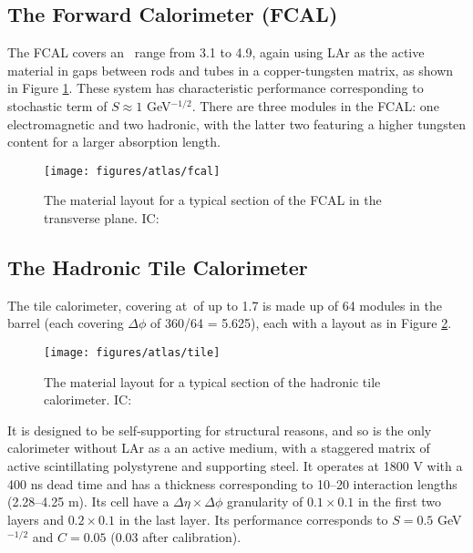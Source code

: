\subsection{The Forward Calorimeter (FCAL)}
The FCAL covers an \aeta\, range from 3.1 to 4.9, again using LAr as the active material in gaps between rods and tubes in a copper-tungsten matrix, as shown in Figure \ref{fig:fcal}.  These system has characteristic performance corresponding to stochastic term of $S\approx1$ GeV$^{-1/2}$.  There are three modules in the FCAL: one electromagnetic and two hadronic, with the latter two featuring a higher tungsten content for a larger absorption length.

\begin{figure}[!htbp]\captionsetup{justification=centering}
  \centering
  \texttt{[image: figures/atlas/fcal]}
  \caption{The material layout for a typical section of the FCAL in the transverse plane.  IC: \cite{jinstpaper}}
  \label{fig:fcal}
\end{figure}

\subsection{The Hadronic Tile Calorimeter}
The tile calorimeter, covering at \aeta\,of up to 1.7 is made up of 64 modules in the barrel (each covering $\Delta\phi$ of 360/64 = 5.625\degree), each with a layout as in Figure \ref{fig:tile}.  
\begin{figure}[!htbp]\captionsetup{justification=centering}
  \centering
  \texttt{[image: figures/atlas/tile]}
  \caption{The material layout for a typical section of the hadronic tile calorimeter.  IC: \cite{jinstpaper}}
  \label{fig:tile}
\end{figure}
It is designed to be self-supporting for structural reasons, and so is the only calorimeter without LAr as a an active medium, with a staggered matrix of active scintillating polystyrene and supporting steel.  It operates at 1800 V with a 400 ns dead time and has a thickness corresponding to 10--20 interaction lengths (2.28--4.25 m).  Its cell have a $\Delta\eta\times\Delta\phi$ granularity of $0.1\times0.1$ in the first two layers and $0.2\times0.1$ in the last layer.  Its performance corresponds to $S=0.5$ GeV$^{-1/2}$ and $C=0.05$ (0.03 after calibration).

